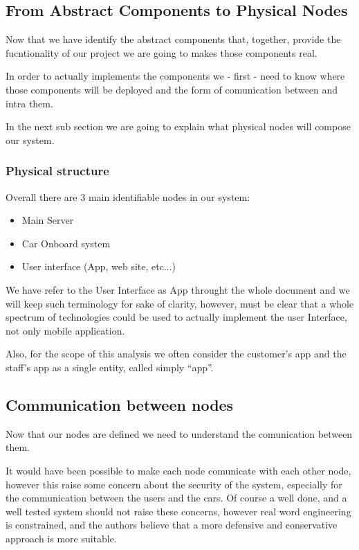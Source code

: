 \documentclass[11pt]{article} %
\begin{document}
\subsection{From Abstract Components to Physical Nodes}

Now that we have identify the abstract components that, together, provide the fucntionality of our project we are going to makes those components real.

In order to actually implements the components we - first - need to know where those components will be deployed and the form of comunication between and intra them.

In the next sub section we are going to explain what physical nodes will compose our system.

\subsubsection{Physical structure}

Overall there are 3 main identifiable nodes in our system:
\begin{itemize}
	\item Main Server
	\item Car Onboard system
	\item User interface (App, web site, etc...)
\end{itemize}

We have refer to the User Interface as App throught the whole document and we will keep such terminology for sake of clarity, however, must be clear that a whole spectrum of technologies could be used to actually implement the user Interface, not only mobile application.

Also, for the scope of this analysis we often consider the customer's app and the staff's app as a single entity, called simply ``app''.


\subsection{Communication between nodes}

Now that our nodes are defined we need to understand the comunication between them.

It would have been possible to make each node comunicate with each other node, however this raise some concern about the security of the system, especially for the communication between the users and the cars. Of course a well done, and a well tested system should not raise these concerns, however real word engineering is constrained, and the authors believe that a more defensive and conservative approach is more suitable.
\end{document}
